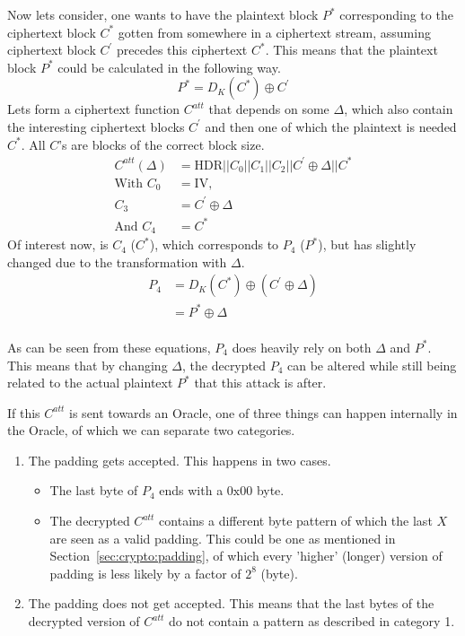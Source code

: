 \documentclass[10pt,conference,a4paper]{IEEEtran}
\begin{document}
Now lets consider, one wants to have the plaintext block $P^{*}$ corresponding to the ciphertext block $C^{*}$ gotten from somewhere in a ciphertext stream, assuming ciphertext block $C^{'}$ precedes this ciphertext $C^{*}$. This means that the plaintext block $P^{*}$ could be calculated in the following way.
\[ P^{*} = D_K(C^{*}) \oplus C^{'} \]
Lets form a ciphertext function $C^{att}$ that depends on some $\Delta$, which also contain the interesting ciphertext blocks $C^{'}$ and then one of which the plaintext is needed $C^{*}$. All $C$'s are blocks of the correct block size.
\[ \begin{split}
C^{att}(\Delta) &= \text{HDR} || C_0 || C_1 || C_2 || C^{'} \oplus \Delta || C^{*} \\
\text{With } C_0 &= \text{IV}, \\
C_3 &= C^{'} \oplus \Delta \\
\text{And } C_4 &= C^{*}
\end{split}  \]
Of interest now, is $C_4$ ($C^{*}$), which corresponds to $P_4$ ($P^{*}$), but has slightly changed due to the transformation with $\Delta$.
\[ \begin{split}
P_4 &= D_K(C^{*}) \oplus (C^{'} \oplus \Delta) \\
&= P^{*} \oplus \Delta \\
\end{split} \]

As can be seen from these equations, $P_4$ does heavily rely on both $\Delta$ and $P^{*}$. This means that by changing $\Delta$, the decrypted $P_4$ can be altered while still being related to the actual plaintext $P^{*}$ that this attack is after.

If this $C^{att}$ is sent towards an Oracle, one of three things can happen internally in the Oracle, of which we can separate two categories.
\begin{enumerate}
  \item The padding gets accepted. This happens in two cases.
	\begin{itemize}
		\item The last byte of $P_4$ ends with a $0\text{x}00$ byte.
		\item The decrypted $C^{att}$ contains a different byte pattern of which the last $X$ are seen as a valid padding. This could be one as mentioned in Section~\ref{sec:crypto:padding}, of which every 'higher' (longer) version of padding is less likely by a factor of $2^8$ (byte).
	\end{itemize}
  \item The padding does not get accepted. This means that the last bytes of the decrypted version of $C^{att}$ do not contain a pattern as described in category 1. 
\end{enumerate}
\end{document}
